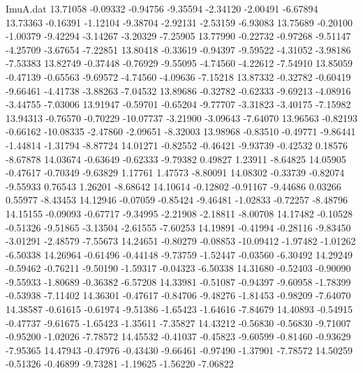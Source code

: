 \begin{filecontents}{ImuA.dat}
  13.71058   -0.09332   -0.94756   -9.35594   -2.34120   -2.00491   -6.67894
  13.73363   -0.16391   -1.12104   -9.38704   -2.92131   -2.53159   -6.93083
  13.75689   -0.20100   -1.00379   -9.42294   -3.14267   -3.20329   -7.25905
  13.77990   -0.22732   -0.97268   -9.51147   -4.25709   -3.67654   -7.22851
  13.80418   -0.33619   -0.94397   -9.59522   -4.31052   -3.98186   -7.53383
  13.82749   -0.37448   -0.76929   -9.55095   -4.74560   -4.22612   -7.54910
  13.85059   -0.47139   -0.65563   -9.69572   -4.74560   -4.09636   -7.15218
  13.87332   -0.32782   -0.60419   -9.66461   -4.41738   -3.88263   -7.04532
  13.89686   -0.32782   -0.62333   -9.69213   -4.08916   -3.44755   -7.03006
  13.91947   -0.59701   -0.65204   -9.77707   -3.31823   -3.40175   -7.15982
  13.94313   -0.76570   -0.70229  -10.07737   -3.21900   -3.09643   -7.64070
  13.96563   -0.82193   -0.66162  -10.08335   -2.47860   -2.09651   -8.32003
  13.98968   -0.83510   -0.49771   -9.86441   -1.44814   -1.31794   -8.87724
  14.01271   -0.82552   -0.46421   -9.93739   -0.42532    0.18576   -8.67878
  14.03674   -0.63649   -0.62333   -9.79382    0.49827    1.23911   -8.64825
  14.05905   -0.47617   -0.70349   -9.63829    1.17761    1.47573   -8.80091
  14.08302   -0.33739   -0.82074   -9.55933    0.76543    1.26201   -8.68642
  14.10614   -0.12802   -0.91167   -9.44686    0.03266    0.55977   -8.43453
  14.12946   -0.07059   -0.85424   -9.46481   -1.02833   -0.72257   -8.48796
  14.15155   -0.09093   -0.67717   -9.34995   -2.21908   -2.18811   -8.00708
  14.17482   -0.10528   -0.51326   -9.51865   -3.13504   -2.61555   -7.60253
  14.19891   -0.41994   -0.28116   -9.83450   -3.01291   -2.48579   -7.55673
  14.24651   -0.80279   -0.08853  -10.09412   -1.97482   -1.01262   -6.50338
  14.26964   -0.61496   -0.44148   -9.73759   -1.52447   -0.03560   -6.30492
  14.29249   -0.59462   -0.76211   -9.50190   -1.59317   -0.04323   -6.50338
  14.31680   -0.52403   -0.90090   -9.55933   -1.80689   -0.36382   -6.57208
  14.33981   -0.51087   -0.94397   -9.60958   -1.78399   -0.53938   -7.11402
  14.36301   -0.47617   -0.84706   -9.48276   -1.81453   -0.98209   -7.64070
  14.38587   -0.61615   -0.61974   -9.51386   -1.65423   -1.64616   -7.84679
  14.40893   -0.54915   -0.47737   -9.61675   -1.65423   -1.35611   -7.35827
  14.43212   -0.56830   -0.56830   -9.71007   -0.95200   -1.02026   -7.78572
  14.45532   -0.41037   -0.45823   -9.60599   -0.81460   -0.93629   -7.95365
  14.47943   -0.47976   -0.43430   -9.66461   -0.97490   -1.37901   -7.78572
  14.50259   -0.51326   -0.46899   -9.73281   -1.19625   -1.56220   -7.06822

\end{filecontents}
